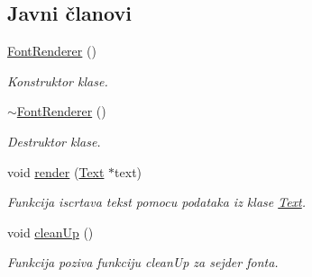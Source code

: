\subsection*{Javni članovi}
\begin{DoxyCompactItemize}
\item 
\hyperlink{classfont_1_1FontRenderer_a272ad655371b8a90e2ae76d03b578a21}{Font\+Renderer} ()
\begin{DoxyCompactList}\small\item\em Konstruktor klase. \end{DoxyCompactList}\item 
\hyperlink{classfont_1_1FontRenderer_adc2bcaedb1eac4421e42b264d186c1bb}{$\sim$\+Font\+Renderer} ()
\begin{DoxyCompactList}\small\item\em Destruktor klase. \end{DoxyCompactList}\item 
void \hyperlink{classfont_1_1FontRenderer_adc45aa765d978d8b445c7e8f2eb5c90a}{render} (\hyperlink{classfont_1_1Text}{Text} $\ast$text)
\begin{DoxyCompactList}\small\item\em Funkcija iscrtava tekst pomocu podataka iz klase \hyperlink{classfont_1_1Text}{Text}. \end{DoxyCompactList}\item 
void \hyperlink{classfont_1_1FontRenderer_ae35691cc191fad294054df6e87cde119}{clean\+Up} ()
\begin{DoxyCompactList}\small\item\em Funkcija poziva funkciju clean\+Up za sejder fonta. \end{DoxyCompactList}\end{DoxyCompactItemize}
